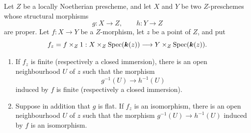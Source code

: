 \begin{proposition}[4.6.7]
\label{III.4.6.7}
Let $Z$ be a locally Noetherian prescheme, and let $X$ and $Y$ be
two $Z$-preschemes whose structural morphisms
\[
  g:X\longrightarrow Z,\qquad h:Y\longrightarrow Z
\]
are proper.  Let $f:X\to Y$ be a $Z$-morphism, let $z$ be a point
of $Z$, and put
\[
  f_z=f\times_Z1:
  X\times_Z\operatorname{Spec}(\boldsymbol{k}(z))
  \longrightarrow
  Y\times_Z\operatorname{Spec}(\boldsymbol{k}(z)).
\]
\begin{enumerate}
\item[(i)] If $f_z$ is finite (respectively a closed immersion),
  there is an open neighbourhood $U$ of $z$ such that the morphism
  \[
    g^{-1}(U)\longrightarrow h^{-1}(U)
  \]
  induced by $f$ is finite (respectively a closed immersion).
\item[(ii)] Suppose in addition that $g$ is flat.  If $f_z$ is an
  isomorphism, there is an open neighbourhood $U$ of $z$ such that
  the morphism $g^{-1}(U)\to h^{-1}(U)$ induced by $f$ is an
  isomorphism.
\end{enumerate}
\end{proposition}

